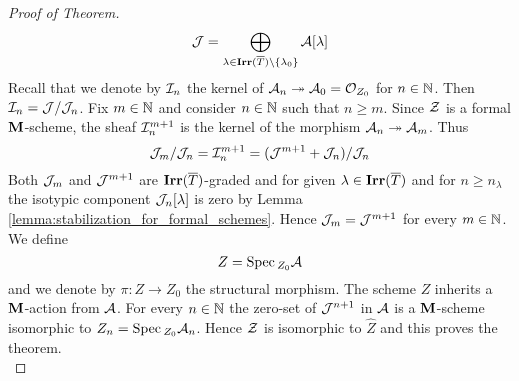 \begin{proof}[Proof of Theorem]
$${\mathcal J}=\bigoplus_{\lambda \in \mathbf{Irr}(\overline{T})\setminus \{\lambda_0\}}{\mathcal A}[\lambda]$$
Recall that we denote by ${\mathcal I}_n$ the kernel of ${\mathcal A}_n\twoheadrightarrow {\mathcal A}_0={\mathcal O}_{Z_0}$ for $n\in {\mathbb N}$. Then ${\mathcal I}_n={\mathcal J}/{\mathcal J}_n$. Fix $m\in {\mathbb N}$ and consider $n\in {\mathbb N}$ such that $n\geq m$. Since ${\mathcal Z}$ is a formal $\mathbf{M}$-scheme, the sheaf ${\mathcal I}_n^{m+1}$ is the kernel of the morphism ${\mathcal A}_n\twoheadrightarrow {\mathcal A}_m$. Thus
$${\mathcal J}_m/{\mathcal J}_n={\mathcal I}_n^{m+1}=({\mathcal J}^{m+1}+{\mathcal J}_n)/{\mathcal J}_n$$
Both ${\mathcal J}_m$ and ${\mathcal J}^{m+1}$ are $\mathbf{Irr}(\overline{T})$-graded and for given $\lambda\in \mathbf{Irr}(\overline{T})$ and for $n \geq n_{\lambda}$ the isotypic component ${\mathcal J}_n[\lambda]$ is zero by Lemma \ref{lemma:stabilization_for_formal_schemes}. Hence ${\mathcal J}_m={\mathcal J}^{m+1}$ for every $m \in {\mathbb N}$.
We define
$$Z=\mathrm{Spec}\,_{Z_0}{\mathcal A}$$
and we denote by $\pi:Z\to Z_0$ the structural morphism. The scheme $Z$ inherits a $\mathbf{M}$-action from ${\mathcal A}$. For every $n\in {\mathbb N}$ the zero-set of ${\mathcal J}^{n+1}$ in ${\mathcal A}$ is a $\mathbf{M}$-scheme isomorphic to $Z_n = \mathrm{Spec}\,_{Z_0}{\mathcal A}_n$. Hence ${\mathcal Z}$ is isomorphic to $\widehat{Z}$ and this proves the theorem.\\
\end{proof}


